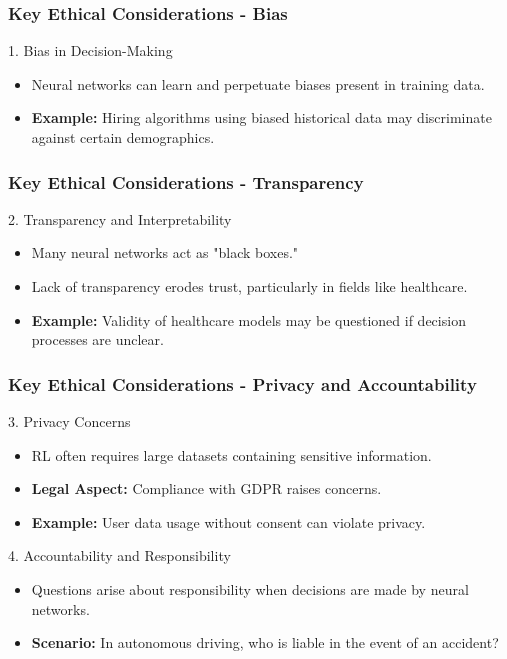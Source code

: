 \documentclass[aspectratio=169]{beamer}
\begin{document}
\begin{frame}[fragile]
    \frametitle{Key Ethical Considerations - Bias}
    \begin{block}{1. Bias in Decision-Making}
        \begin{itemize}
            \item Neural networks can learn and perpetuate biases present in training data.
            \item \textbf{Example:} Hiring algorithms using biased historical data may discriminate against certain demographics.
        \end{itemize}
    \end{block}
\end{frame}

\begin{frame}[fragile]
    \frametitle{Key Ethical Considerations - Transparency}
    \begin{block}{2. Transparency and Interpretability}
        \begin{itemize}
            \item Many neural networks act as "black boxes."
            \item Lack of transparency erodes trust, particularly in fields like healthcare.
            \item \textbf{Example:} Validity of healthcare models may be questioned if decision processes are unclear.
        \end{itemize}
    \end{block}
\end{frame}

\begin{frame}[fragile]
    \frametitle{Key Ethical Considerations - Privacy and Accountability}
    \begin{block}{3. Privacy Concerns}
        \begin{itemize}
            \item RL often requires large datasets containing sensitive information.
            \item \textbf{Legal Aspect:} Compliance with GDPR raises concerns.
            \item \textbf{Example:} User data usage without consent can violate privacy.
        \end{itemize}
    \end{block}
    
    \begin{block}{4. Accountability and Responsibility}
        \begin{itemize}
            \item Questions arise about responsibility when decisions are made by neural networks.
            \item \textbf{Scenario:} In autonomous driving, who is liable in the event of an accident?
        \end{itemize}
    \end{block}
\end{frame}
\end{document}
